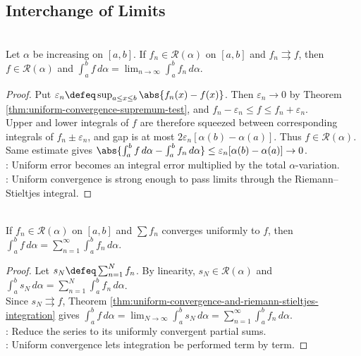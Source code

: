 \subsection{Interchange of Limits}

\begin{theorem} \label{thm:uniform-convergence-and-riemann-stieltjes-integration} \\
Let $\alpha$ be increasing on $[a,b]$. If $f_n\in\mathcal{R}(\alpha)$ on $[a,b]$ and $f_n\rightrightarrows f$, then $f\in\mathcal{R}(\alpha)$ and $\int_a^b f\,d\alpha=\lim_{n\to\infty}\int_a^b f_n\,d\alpha$.
\begin{proof}
Put $\varepsilon_n\defeq\sup_{a\leq x\leq b}\abs{f_n(x)-f(x)}$. Then $\varepsilon_n\to0$ by Theorem \ref{thm:uniform-convergence-supremum-test}, and $f_n-\varepsilon_n\leq f\leq f_n+\varepsilon_n$.\\
Upper and lower integrals of $f$ are therefore squeezed between corresponding integrals of $f_n\pm\varepsilon_n$, and gap is at most $2\varepsilon_n[\alpha(b)-\alpha(a)]$. Thus $f\in\mathcal{R}(\alpha)$. Same estimate gives $\abs{\int_a^b f\,d\alpha-\int_a^b f_n\,d\alpha}\leq \varepsilon_n[\alpha(b)-\alpha(a)]\to0$.\\
: Uniform error becomes an integral error multiplied by the total $\alpha$-variation.\\
: Uniform convergence is strong enough to pass limits through the Riemann--Stieltjes integral.
\end{proof}
\end{theorem}

\begin{corollary} \label{cor:termwise-riemann-stieltjes-integration} \\
If $f_n\in\mathcal{R}(\alpha)$ on $[a,b]$ and $\sum f_n$ converges uniformly to $f$, then $\int_a^b f\,d\alpha=\sum\limits_{n=1}^{\infty}\int_a^b f_n\,d\alpha$.
\begin{proof}
Let $s_N\defeq\sum_{n=1}^{N}f_n$. By linearity, $s_N\in\mathcal{R}(\alpha)$ and $\int_a^b s_N\,d\alpha=\sum_{n=1}^{N}\int_a^b f_n\,d\alpha$.\\
Since $s_N\rightrightarrows f$, Theorem \ref{thm:uniform-convergence-and-riemann-stieltjes-integration} gives $\int_a^b f\,d\alpha=\lim_{N\to\infty}\int_a^b s_N\,d\alpha=\sum\limits_{n=1}^{\infty}\int_a^b f_n\,d\alpha$.\\
: Reduce the series to its uniformly convergent partial sums.\\
: Uniform convergence lets integration be performed term by term.
\end{proof}
\end{corollary}

